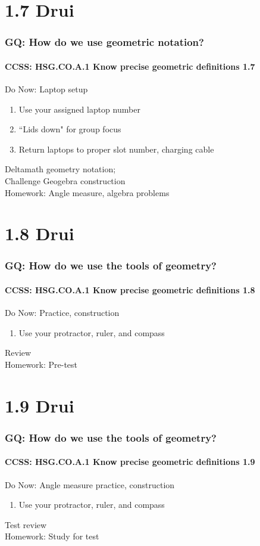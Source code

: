 \documentclass{beamer}
\begin{document}
\section{1.7 Drui}
  \frame
  {
    \frametitle{GQ: How do we use geometric notation?}
    \framesubtitle{CCSS: HSG.CO.A.1 Know precise geometric definitions  \alert{1.7}}

    \begin{block}{Do Now: Laptop setup}
    \begin{enumerate}
        \item Use your assigned laptop number
        \item ``Lids down" for group focus
        \item Return laptops to proper slot number, charging cable
    \end{enumerate}
    \end{block}
    Deltamath geometry notation; \\Challenge Geogebra construction\\
    \vspace{1cm}
    Homework: Angle measure, algebra problems
  }

\section{1.8 Drui}
  \frame
  {
    \frametitle{GQ: How do we use the tools of geometry?}
    \framesubtitle{CCSS: HSG.CO.A.1 Know precise geometric definitions  \alert{1.8}}

    \begin{block}{Do Now: Practice, construction}
    \begin{enumerate}
        \item Use your protractor, ruler, and compass
    \end{enumerate}
    \end{block}
    Review\\
    \vspace{1cm}
    Homework: Pre-test
  }

\section{1.9 Drui}
  \frame
  {
    \frametitle{GQ: How do we use the tools of geometry?}
    \framesubtitle{CCSS: HSG.CO.A.1 Know precise geometric definitions  \alert{1.9}}

    \begin{block}{Do Now: Angle measure practice, construction}
    \begin{enumerate}
        \item Use your protractor, ruler, and compass
    \end{enumerate}
    \end{block}
    Test review\\
    \vspace{1cm}
    Homework: Study for test
  }
\end{document}
